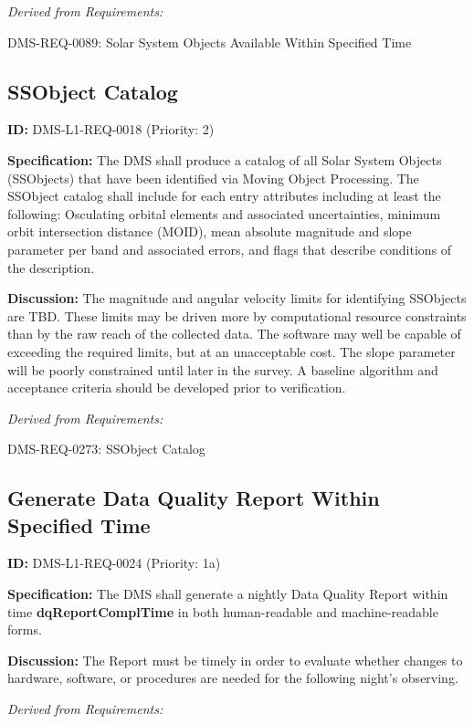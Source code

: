 \documentclass[SE,toc,lsstdraft]{lsstdoc}
\begin{document}
\emph{Derived from Requirements:}

DMS-REQ-0089:
Solar System Objects Available Within Specified Time \newline

\subsection{SSObject Catalog}

\label{DMS-L1-REQ-0018}
\textbf{ID:} DMS-L1-REQ-0018 (Priority: 2)

\textbf{Specification:} The DMS shall produce a catalog of all Solar System Objects (SSObjects) that have been identified via Moving Object Processing. The SSObject catalog shall include for each entry attributes including at least the following: Osculating orbital elements and associated uncertainties, minimum orbit intersection distance (MOID), mean absolute magnitude and slope parameter per band and associated errors, and flags that describe conditions of the description.

\textbf{Discussion: }The magnitude and angular velocity limits for identifying SSObjects are TBD. These limits may be driven more by computational resource constraints than by the raw reach of the collected data. The software may well be capable of exceeding the required limits, but at an unacceptable cost. The slope parameter will be poorly constrained until later in the survey. A baseline algorithm and acceptance criteria should be developed prior to verification.

\emph{Derived from Requirements:}

DMS-REQ-0273:
SSObject Catalog \newline

\subsection{Generate Data Quality Report Within Specified Time}

\label{DMS-L1-REQ-0024}
\textbf{ID:} DMS-L1-REQ-0024 (Priority: 1a)

\textbf{Specification:} The DMS shall generate a nightly Data Quality Report within time \textbf{dqReportComplTime }in both human-readable and machine-readable forms.

\textbf{Discussion:} The Report must be timely in order to evaluate whether changes to hardware, software, or procedures are needed for the following night's observing.

\emph{Derived from Requirements:}
\end{document}
